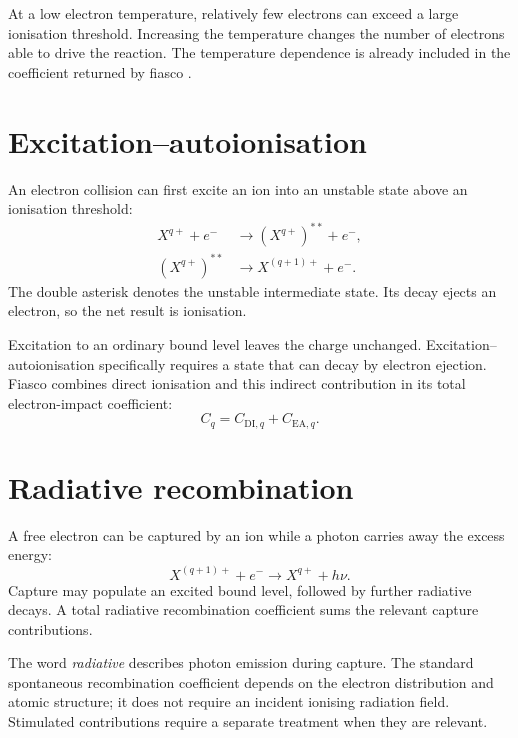 \documentclass[a4paper,10pt,twoside,openany]{book}
\numberwithin{equation}{chapter}
\begin{document}
At a low electron temperature, relatively few electrons can exceed
a large ionisation threshold. Increasing the temperature changes
the number of electrons able to drive the reaction. The
temperature dependence is already included in the coefficient
returned by fiasco \cite{FiascoDocs}.

\section{Excitation--autoionisation}
An electron collision can first excite an ion into an unstable
state above an ionisation threshold:
\begin{align}
  X^{q+}+e^- &\longrightarrow (X^{q+})^{**}+e^-,\\
  (X^{q+})^{**} &\longrightarrow X^{(q+1)+}+e^-.
\end{align}
The double asterisk denotes the unstable intermediate state.
Its decay ejects an electron, so the net result is ionisation.

Excitation to an ordinary bound level leaves the charge unchanged.
Excitation--autoionisation specifically requires a state that can
decay by electron ejection. Fiasco combines direct ionisation and
this indirect contribution in its total electron-impact coefficient:
\begin{equation}
  C_q=C_{\mathrm{DI},q}+C_{\mathrm{EA},q}.
\end{equation}

\section{Radiative recombination}
A free electron can be captured by an ion while a photon carries
away the excess energy:
\begin{equation}
  X^{(q+1)+}+e^-\longrightarrow X^{q+}+h\nu.
\end{equation}
Capture may populate an excited bound level, followed by further
radiative decays. A total radiative recombination coefficient sums
the relevant capture contributions.

The word \emph{radiative} describes photon emission during capture.
The standard spontaneous recombination coefficient depends on the
electron distribution and atomic structure; it does not require an
incident ionising radiation field. Stimulated contributions require
a separate treatment when they are relevant.
\end{document}
